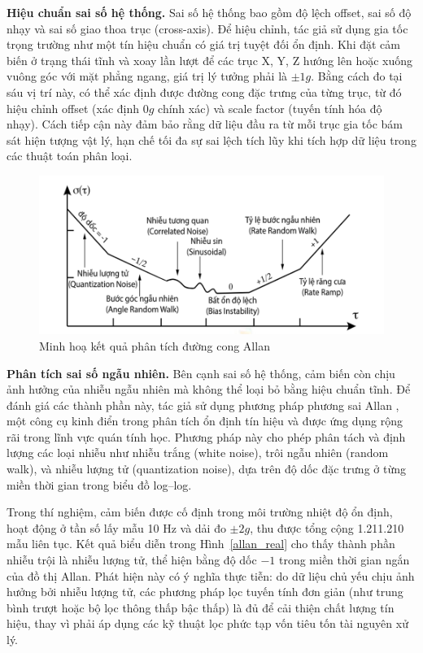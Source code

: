 \textbf{Hiệu chuẩn sai số hệ thống.} Sai số hệ thống bao gồm độ lệch offset, sai số độ nhạy và sai số giao thoa trục (cross-axis). Để hiệu chỉnh, tác giả sử dụng gia tốc trọng trường như một tín hiệu chuẩn có giá trị tuyệt đối ổn định. Khi đặt cảm biến ở trạng thái tĩnh và xoay lần lượt để các trục X, Y, Z hướng lên hoặc xuống vuông góc với mặt phẳng ngang, giá trị lý tưởng phải là $\pm1g$. Bằng cách đo tại sáu vị trí này, có thể xác định được đường cong đặc trưng của từng trục, từ đó hiệu chỉnh offset (xác định $0g$ chính xác) và scale factor (tuyến tính hóa độ nhạy). Cách tiếp cận này đảm bảo rằng dữ liệu đầu ra từ mỗi trục gia tốc bám sát hiện tượng vật lý, hạn chế tối đa sự sai lệch tích lũy khi tích hợp dữ liệu trong các thuật toán phân loại.

\begin{figure}[htbp]
\centering
\includegraphics[width=\textwidth]{images/allan.png}
\caption{Minh hoạ kết quả phân tích đường cong Allan}
\label{allan}
\end{figure}

\textbf{Phân tích sai số ngẫu nhiên.} Bên cạnh sai số hệ thống, cảm biến còn chịu ảnh hưởng của nhiễu ngẫu nhiên mà không thể loại bỏ bằng hiệu chuẩn tĩnh. Để đánh giá các thành phần này, tác giả sử dụng phương pháp phương sai Allan \cite{allan}, một công cụ kinh điển trong phân tích ổn định tín hiệu và được ứng dụng rộng rãi trong lĩnh vực quán tính học. Phương pháp này cho phép phân tách và định lượng các loại nhiễu như nhiễu trắng (white noise), trôi ngẫu nhiên (random walk), và nhiễu lượng tử (quantization noise), dựa trên độ dốc đặc trưng ở từng miền thời gian trong biểu đồ log–log.

Trong thí nghiệm, cảm biến được cố định trong môi trường nhiệt độ ổn định, hoạt động ở tần số lấy mẫu 10 Hz và dải đo $\pm 2g$, thu được tổng cộng 1.211.210 mẫu liên tục. Kết quả biểu diễn trong Hình~\ref{allan_real} cho thấy thành phần nhiễu trội là nhiễu lượng tử, thể hiện bằng độ dốc $-1$ trong miền thời gian ngắn của đồ thị Allan. Phát hiện này có ý nghĩa thực tiễn: do dữ liệu chủ yếu chịu ảnh hưởng bởi nhiễu lượng tử, các phương pháp lọc tuyến tính đơn giản (như trung bình trượt hoặc bộ lọc thông thấp bậc thấp) là đủ để cải thiện chất lượng tín hiệu, thay vì phải áp dụng các kỹ thuật lọc phức tạp vốn tiêu tốn tài nguyên xử lý.

